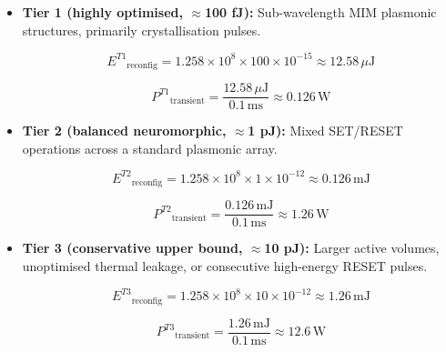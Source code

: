 \documentclass[journal]{IEEEtran}
\begin{document}
\begin{itemize}
\item \textbf{Tier 1 (highly optimised, $\approx$100 fJ):} Sub-wavelength MIM plasmonic structures, primarily crystallisation pulses.

\begin{equation}
{E^{T1}}_{\text{reconfig}} = 1.258 \times 10^{8} \times 100 \times 10^{-15} \approx 12.58\,\mu\text{J}
\end{equation}

\begin{equation}
{P^{T1}}_{\text{transient}} = \frac{12.58\,\mu\text{J}}{0.1\,\text{ms}} \approx 0.126\,\text{W}
\end{equation}

\item \textbf{Tier 2 (balanced neuromorphic, $\approx$1 pJ):} Mixed SET/RESET operations across a standard plasmonic array.

\begin{equation}
{E^{T2}}_{\text{reconfig}} = 1.258 \times 10^{8} \times 1 \times 10^{-12} \approx 0.126\,\text{mJ}
\end{equation}

\begin{equation}
{P^{T2}}_{\text{transient}} = \frac{0.126\,\text{mJ}}{0.1\,\text{ms}} \approx 1.26\,\text{W}
\end{equation}

\item \textbf{Tier 3 (conservative upper bound, $\approx$10 pJ):} Larger active volumes, unoptimised thermal leakage, or consecutive high-energy RESET pulses.

\begin{equation}
{E^{T3}}_{\text{reconfig}} = 1.258 \times 10^{8} \times 10 \times 10^{-12} \approx 1.26\,\text{mJ}
\end{equation}

\begin{equation}
{P^{T3}}_{\text{transient}} = \frac{1.26\,\text{mJ}}{0.1\,\text{ms}} \approx 12.6\,\text{W}
\end{equation}
\end{itemize}
\end{document}
